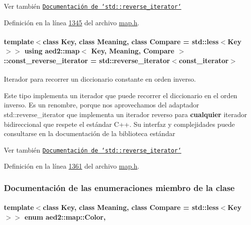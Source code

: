 \begin{DoxySeeAlso}{Ver también}
\href{http://en.cppreference.com/w/cpp/iterator/reverse_iterator}{\tt Documentación de `std\-::reverse\-\_\-iterator`} 
\end{DoxySeeAlso}


Definición en la línea \hyperlink{map_8h_source_l01345}{1345} del archivo \hyperlink{map_8h_source}{map.\-h}.

\hypertarget{classaed2_1_1map_aed66a216549d13078a3ea6978ea0b768_aed66a216549d13078a3ea6978ea0b768}{
\paragraph[{const\-\_\-reverse\-\_\-iterator}]{\setlength{\rightskip}{0pt plus 5cm}template$<$class Key, class Meaning, class Compare = std\-::less$<$\-Key$>$$>$ using {\bf aed2\-::map}$<$ Key, Meaning, Compare $>$\-::{\bf const\-\_\-reverse\-\_\-iterator} =  std\-::reverse\-\_\-iterator$<${\bf const\-\_\-iterator}$>$}}\label{classaed2_1_1map_aed66a216549d13078a3ea6978ea0b768_aed66a216549d13078a3ea6978ea0b768}


Iterador para recorrer un diccionario constante en orden inverso. 

Este tipo implementa un iterador que puede recorrer el diccionario en el orden inverso. Es un renombre, porque nos aprovechamos del adaptador {\ttfamily std\-::reverse\-\_\-iterator} que implementa un iterador reverso para {\bfseries cualquier} iterador bidireccional que respete el estándar C++. Su interfaz y complejidades puede consultarse en la documentación de la biblioteca estándar

\begin{DoxySeeAlso}{Ver también}
\href{http://en.cppreference.com/w/cpp/iterator/reverse_iterator}{\tt Documentación de `std\-::reverse\-\_\-iterator`} 
\end{DoxySeeAlso}


Definición en la línea \hyperlink{map_8h_source_l01361}{1361} del archivo \hyperlink{map_8h_source}{map.\-h}.



\subsubsection{Documentación de las enumeraciones miembro de la clase}
\hypertarget{classaed2_1_1map_a6d62a415a4b9d320b30cada4ebcf9f5b_a6d62a415a4b9d320b30cada4ebcf9f5b}{
\paragraph[{Color}]{\setlength{\rightskip}{0pt plus 5cm}template$<$class Key, class Meaning, class Compare = std\-::less$<$\-Key$>$$>$ enum {\bf aed2\-::map\-::\-Color}\hspace{0.3cm}{\ttfamily [strong]}, {\ttfamily [private]}}}\label{classaed2_1_1map_a6d62a415a4b9d320b30cada4ebcf9f5b_a6d62a415a4b9d320b30cada4ebcf9f5b}


